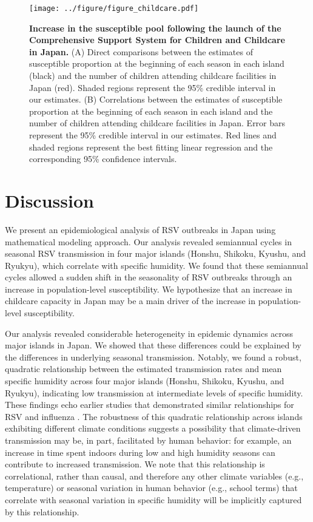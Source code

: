 \documentclass[12pt]{article}
\begin{document}
\begin{figure}[!th]
\texttt{[image: ../figure/figure\_childcare.pdf]}
\caption{
\textbf{Increase in the susceptible pool following the launch of the Comprehensive Support System for Children and Childcare in Japan.}
(A) Direct comparisons between the estimates of susceptible proportion at the beginning of each season in each island (black) and the number of children attending childcare facilities in Japan (red).
Shaded regions represent the 95\% credible interval in our estimates.
(B) Correlations between the estimates of susceptible proportion at the beginning of each season in each island and the number of children attending childcare facilities in Japan.
Error bars represent  the 95\% credible interval in our estimates.
Red lines and shaded regions represent the best fitting linear regression and the corresponding 95\% confidence intervals.
}
\label{fig:fig4}
\end{figure}

\section*{Discussion}

We present an epidemiological analysis of RSV outbreaks in Japan using mathematical modeling approach.
Our analysis revealed semiannual cycles in seasonal RSV transmission in four major islands (Honshu, Shikoku, Kyushu, and Ryukyu), which correlate with specific humidity.
We found that these semiannual cycles allowed a sudden shift in the seasonality of RSV outbreaks through an increase in population-level susceptibility.
We hypothesize that an increase in childcare capacity in Japan may be a main driver of the increase in population-level susceptibility.

Our analysis revealed considerable heterogeneity in epidemic dynamics across major islands in Japan.
We showed that these differences could be explained by the differences in underlying seasonal transmission.
Notably, we found a robust, quadratic relationship between the estimated transmission rates and mean specific humidity across four major islands (Honshu, Shikoku, Kyushu, and Ryukyu), indicating low transmission at intermediate levels of specific humidity.
These findings echo earlier studies that demonstrated similar relationships for RSV \citep{baker2019epidemic} and influenza \citep{lowen2007influenza,shaman2009absolute,shaman2010absolute,tamerius2013environmental,lowen2014roles}.
The robustness of this quadratic relationship across islands exhibiting different climate conditions suggests a possibility that climate-driven transmission may be, in part, facilitated by human behavior: for example, an increase in time spent indoors during low and high humidity seasons can contribute to increased transmission.
We note that this relationship is correlational, rather than causal, and therefore any other climate variables (e.g., temperature) or seasonal variation in human behavior (e.g., school terms) that correlate with seasonal variation in specific humidity will be implicitly captured by this relationship.
\end{document}
